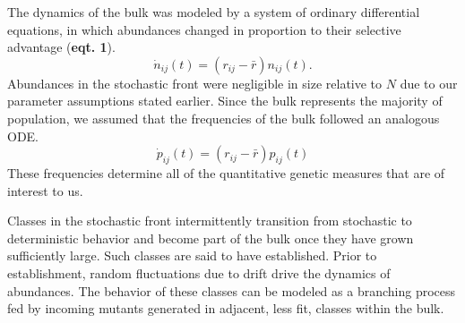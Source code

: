 \documentclass[11pt,twocolumn]{article}
\begin{document}
The dynamics of the bulk was modeled by a system of ordinary differential equations, in which abundances changed in proportion to their selective advantage (\textbf{eqt. 1}). 
\begin{equation} 
\dot{n}_{ij}(t) = (r_{ij}-\bar{r}) n_{ij}(t). 
\end{equation}
Abundances in the stochastic front were negligible in size relative to $N$ due to our parameter assumptions stated earlier.  Since the bulk represents the majority of population, we assumed that the frequencies of the bulk followed an analogous ODE.
\begin{equation} 
\dot{p}_{ij}(t) = (r_{ij}-\bar{r}) p_{ij}(t) 
\end{equation}
These frequencies determine all of the quantitative genetic measures that are of interest to us.\par

Classes in the stochastic front intermittently transition from stochastic to deterministic behavior and become part of the bulk once they have grown sufficiently large. Such classes are said to have established. Prior to establishment, random fluctuations due to drift drive the dynamics of abundances. The behavior of these classes can be modeled as a branching process fed by incoming mutants generated in adjacent, less fit, classes within the bulk. 
\end{document}

